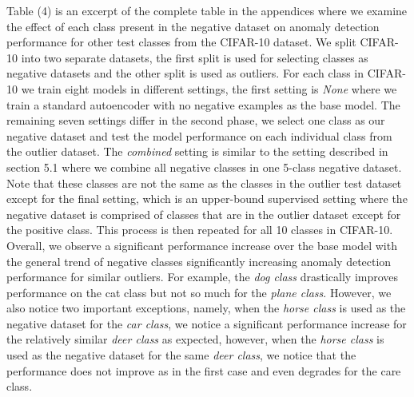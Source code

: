 \documentclass[acmtog, nonacm]{acmart}
\begin{document}
Table (4) is an excerpt of the complete table in the appendices where we examine the effect of each class present in the negative dataset on anomaly detection performance for other test classes from the CIFAR-10 dataset. We split CIFAR-10 into two separate datasets, the first split is used for selecting classes as negative datasets and the other split is used as outliers. For each class in CIFAR-10 we train eight models in different settings, the first setting is \textit{None} where we train a standard autoencoder with no negative examples as the base model. The remaining seven settings differ in the second phase, we select one class as our negative dataset and test the model performance on each individual class from the outlier dataset. The \textit{combined} setting is similar to the setting described in section 5.1 where we combine all negative classes in one 5-class negative dataset. Note that these classes are not the same as the classes in the outlier test dataset except for the final setting, which is an upper-bound supervised setting where the negative dataset is comprised of classes that are in the outlier dataset except for the positive class. This process is then repeated for all 10 classes in CIFAR-10.
Overall, we observe a significant performance increase over the base model with the general trend of negative classes significantly increasing anomaly detection performance for similar outliers. For example, the \textit{dog class} drastically improves performance on the cat class but not so much for the \textit{plane class}. However, we also notice two important exceptions, namely, when the \textit{horse class} is used as the negative dataset for the \textit{car class}, we notice a significant performance increase for the relatively similar \textit{deer class} as expected, however, when the \textit{horse class} is used as the negative dataset for the same \textit{deer class}, we notice that the performance does not improve as in the first case and even degrades for the care class.
\end{document}
